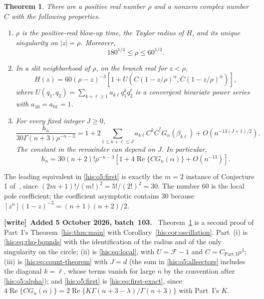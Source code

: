 \documentclass[11pt]{article}
\newtheorem{theorem}{Theorem}[section]
\theoremstyle{remark}\newtheorem{remark}[theorem]{Remark}
\DeclareMathOperator{\Rea}{Re}
\newcommand{\la}{\lambda}
\numberwithin{equation}{section}
\newenvironment{writenote}[1][]{\par\smallskip\begingroup\small
 \noindent\textbf{[write]}\if\relax\detokenize{#1}\relax\else~\textbf{#1.}\fi\ }%
 {\par\endgroup\smallskip}
\begin{document}
\begin{theorem}\label{his:o5:main}
There are a positive real number $\rho$ and a nonzero complex number $C$
with the following properties.
\begin{enumerate}[label=(\roman*)]
\item $\rho$ is the positive-real blow-up time, the Taylor radius of $H$,
and its unique singularity on $|z|=\rho$. Moreover,
\begin{equation}\label{his:o5:bounds}
180^{1/4}\le\rho\le60^{1/3}.
\end{equation}
\item In a slit neighborhood of $\rho$, on the branch real for $z<\rho$,
\begin{equation}\label{his:o5:local-main}
H(z)=60(\rho-z)^{-3}
\left[1+U\left(C(1-z/\rho)^\alpha,
\overline C(1-z/\rho)^{\overline\alpha}\right)\right],
\end{equation}
where $U(q_1,q_2)=\sum_{k+\ell\ge1}a_{k\ell}q_1^kq_2^\ell$
is a convergent bivariate power series with $a_{10}=a_{01}=1$.
\item For every fixed integer $J\ge0$,
\begin{equation}\label{his:o5:allsectors}
\frac{h_n}{30\Gamma(n+3)\rho^{-n-3}}
=1+2\!\sum_{1\le k+\ell\le J}
 a_{k\ell}C^k\overline C^{\ell}G_n(\beta_{k\ell})
 +O\!\left(n^{-13(J+1)/2}\right).
\end{equation}
The constant in the remainder can depend on $J$. In particular,
\begin{equation}\label{his:o5:first}
h_n=30(n+2)!\rho^{-n-3}
\left[1+4\Rea\{C G_n(\alpha)\}+O(n^{-13})\right].
\end{equation}
\end{enumerate}
\end{theorem}

The leading equivalent in \eqref{his:o5:first} is exactly the $m=2$ instance of
Conjecture 1 of~\cite[p.~10]{bw2026}, since
$(2m+1)!/(m!)^2=5!/(2!)^2=30$.
The number $60$ is the local pole coefficient; the coefficient asymptotic
contains $30$ because $[z^n](1-z)^{-3}=(n+1)(n+2)/2$.
\begin{writenote}[Added 5 October 2026, batch~103]
Theorem~\ref{his:o5:main} is a second proof of Part~I's Theorem~\ref{his:thm:main} with Corollary~\ref{his:cor:oscillation}. Part~(i) is \eqref{his:eq:rho-bounds} with the identification of the radius and of the only singularity on the circle; (ii) is \eqref{his:eq:local}, with $U=\mathcal F-1$ and $C=C_{\text{Part I}}\rho^\la$; (iii) is \eqref{his:eq:count-theorem} with $J=d$ (the sum in \eqref{his:o5:allsectors} includes the diagonal $k=\ell$, whose terms vanish for large $n$ by the convention after \eqref{his:o5:alpha}); and \eqref{his:o5:first} is \eqref{his:eq:first-exact}, since $4\Rea\{CG_n(\alpha)\}=2\Rea\{K\Gamma(n+3-\la)/\Gamma(n+3)\}$ with Part~I's $K$.
\end{writenote}
\end{document}
